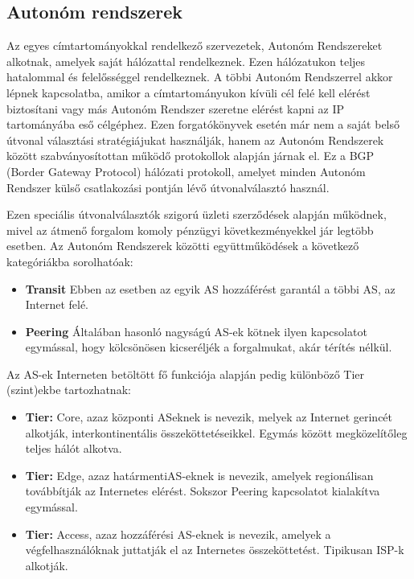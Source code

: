 \subsection{Autonóm rendszerek}

Az egyes címtartományokkal rendelkező szervezetek, Autonóm Rendszereket alkotnak, amelyek saját hálózattal rendelkeznek. Ezen hálózatukon teljes hatalommal és felelősséggel rendelkeznek. A többi Autonóm Rendszerrel akkor lépnek kapcsolatba, amikor a címtartományukon kívüli cél felé kell elérést biztosítani vagy más Autonóm Rendszer szeretne elérést kapni az IP tartományába eső célgéphez.
Ezen forgatókönyvek esetén már nem a saját belső útvonal választási stratégiájukat használják, hanem az Autonóm Rendszerek között szabványosítottan működő protokollok alapján járnak el. Ez a BGP (Border Gateway Protocol) hálózati protokoll, amelyet minden Autonóm Rendszer külső csatlakozási pontján lévő útvonalválasztó használ. 

Ezen speciális útvonalválasztók szigorú üzleti szerződések alapján működnek, mivel az átmenő forgalom komoly pénzügyi következményekkel jár legtöbb esetben.
Az Autonóm Rendszerek közötti együttműködések a következő kategóriákba sorolhatóak:

\begin{itemize}
\setlength{\parskip}{0pt}
\setlength{\itemsep}{0pt plus 1pt}
  
\item \textbf{Transit} Ebben az esetben az egyik AS hozzáférést garantál a többi AS, az Internet felé.
\item \textbf{Peering} Általában hasonló nagyságú AS-ek kötnek ilyen kapcsolatot egymással, hogy kölcsönösen kicseréljék a forgalmukat, akár térítés nélkül.
\end{itemize}

Az AS-ek Interneten betöltött fő funkciója alapján pedig különböző Tier (szint)\-ekbe tartozhatnak: 

\begin{itemize}
\setlength{\parskip}{0pt}
\setlength{\itemsep}{0pt plus 1pt}
  
\item \textbf{Tier:} Core, azaz központi AS\-eknek is nevezik, melyek az Internet gerincét alkotják, interkontinentális összeköttetéseikkel. Egymás között megközelítőleg teljes hálót alkotva.

\item \textbf{Tier:} Edge, azaz \glqq határmenti\grqq AS-eknek is nevezik, amelyek regionálisan továbbítják az Internetes elérést. Sokszor Peering kapcsolatot kialakítva egymással.

\item \textbf{Tier:} Access, azaz hozzáférési AS-eknek is nevezik, amelyek a végfelhasználóknak juttatják el az Internetes összeköttetést. Tipikusan ISP-k alkotják.
\end{itemize}

